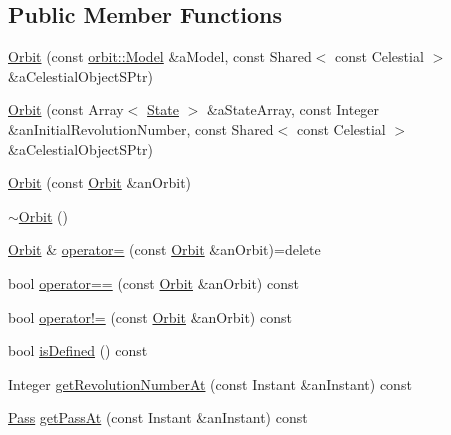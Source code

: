 \subsection*{Public Member Functions}
\begin{DoxyCompactItemize}
\item 
\hyperlink{classlibrary_1_1astro_1_1trajectory_1_1_orbit_af2aec60afc1bbebd46991005cf04026e}{Orbit} (const \hyperlink{classlibrary_1_1astro_1_1trajectory_1_1orbit_1_1_model}{orbit\+::\+Model} \&a\+Model, const Shared$<$ const Celestial $>$ \&a\+Celestial\+Object\+S\+Ptr)
\item 
\hyperlink{classlibrary_1_1astro_1_1trajectory_1_1_orbit_aea59cb4c5be4c8d4bcbac7256d28683d}{Orbit} (const Array$<$ \hyperlink{classlibrary_1_1astro_1_1trajectory_1_1_state}{State} $>$ \&a\+State\+Array, const Integer \&an\+Initial\+Revolution\+Number, const Shared$<$ const Celestial $>$ \&a\+Celestial\+Object\+S\+Ptr)
\item 
\hyperlink{classlibrary_1_1astro_1_1trajectory_1_1_orbit_abf3190fc9317ab9b927c2de0bfadad49}{Orbit} (const \hyperlink{classlibrary_1_1astro_1_1trajectory_1_1_orbit}{Orbit} \&an\+Orbit)
\item 
\hyperlink{classlibrary_1_1astro_1_1trajectory_1_1_orbit_a6408656107990a10c28329cac3786809}{$\sim$\+Orbit} ()
\item 
\hyperlink{classlibrary_1_1astro_1_1trajectory_1_1_orbit}{Orbit} \& \hyperlink{classlibrary_1_1astro_1_1trajectory_1_1_orbit_a236db4ba5038c4f183db33f1e93f8e26}{operator=} (const \hyperlink{classlibrary_1_1astro_1_1trajectory_1_1_orbit}{Orbit} \&an\+Orbit)=delete
\item 
bool \hyperlink{classlibrary_1_1astro_1_1trajectory_1_1_orbit_a3af58a0fe7d899ba73ab5ac3af310425}{operator==} (const \hyperlink{classlibrary_1_1astro_1_1trajectory_1_1_orbit}{Orbit} \&an\+Orbit) const
\item 
bool \hyperlink{classlibrary_1_1astro_1_1trajectory_1_1_orbit_a2fee5670dc09be5217b34d205f2cd8a8}{operator!=} (const \hyperlink{classlibrary_1_1astro_1_1trajectory_1_1_orbit}{Orbit} \&an\+Orbit) const
\item 
bool \hyperlink{classlibrary_1_1astro_1_1trajectory_1_1_orbit_acbae85c106e53c5127d7053ded53557e}{is\+Defined} () const
\item 
Integer \hyperlink{classlibrary_1_1astro_1_1trajectory_1_1_orbit_ad18a350be011152ca1daf597786cf464}{get\+Revolution\+Number\+At} (const Instant \&an\+Instant) const
\item 
\hyperlink{classlibrary_1_1astro_1_1trajectory_1_1orbit_1_1_pass}{Pass} \hyperlink{classlibrary_1_1astro_1_1trajectory_1_1_orbit_afea348a49c2844ada41cc35f05851b77}{get\+Pass\+At} (const Instant \&an\+Instant) const

\end{DoxyCompactItemize}
